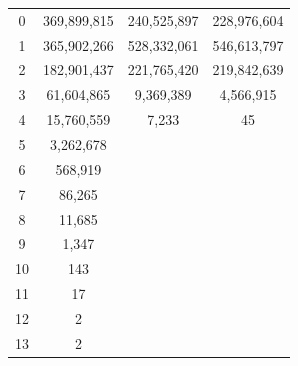 \begin{tabular}{|c|c|c|c|}
  0 & 369,899,815  &  240,525,897  &  228,976,604 \\
  1 & 365,902,266  &  528,332,061  &  546,613,797 \\
  2 & 182,901,437  &  221,765,420  &  219,842,639 \\
  3 &  61,604,865  &    9,369,389  &    4,566,915 \\
  4 &  15,760,559  &        7,233  &           45 \\
  5 &   3,262,678  &               &              \\
  6 &     568,919  &               &              \\
  7 &      86,265  &               &              \\
  8 &      11,685  &               &              \\
  9 &       1,347  &               &              \\
  10 &         143  &               &              \\
  11 &          17  &               &              \\
  12 &           2  &               &              \\
  13 &           2  &               &              \\
\end{tabular}


